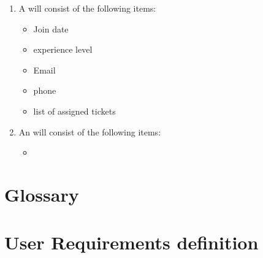 \documentclass[letterpaper]{article}
\begin{document}
\begin{enumerate}
  \item A  will consist of the following items:
        \begin{itemize}
          \item Join date
          \item experience level
          \item Email
          \item phone
          \item list of assigned tickets
        \end{itemize}
  \item An  will consist of the following items:
        \begin{itemize}
          \item
        \end{itemize}
\end{enumerate}
\pagebreak

\section{Glossary}
\glsaddall
\printglossaries
\pagebreak

\section{User Requirements definition}


\pagebreak


\end{document}
